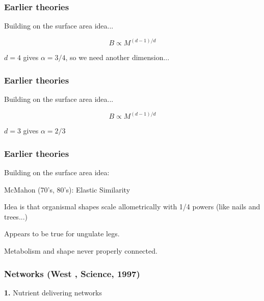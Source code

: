 \begin{frame}
  \frametitle{Earlier theories}

Building on the surface area idea...


$$B \propto M^{(d-1)/d}$$


\inv

$d=4$ gives $\alpha = 3/4$, so we need another dimension...

\vis

\end{frame}

\begin{frame}
  \frametitle{Earlier theories}

Building on the surface area idea...


$$B \propto M^{(d-1)/d}$$


$d=3$ gives $\alpha = 2/3$


\inv

\vis


\end{frame}

\begin{frame}
  \frametitle{Earlier theories}

Building on the surface area idea:

McMahon (70's, 80's): Elastic Similarity

 Idea is that organismal shapes scale allometrically
with 1/4 powers {\small (like nails and trees...)}

 Appears to be true for ungulate legs.

 Metabolism and shape never properly connected.

\end{frame}

\begin{frame}
  \frametitle{Networks {\tiny (West \etal, Science, 1997)}}

  \textbf{1.} Nutrient delivering networks 


  \inv


  \vis

\end{frame}

